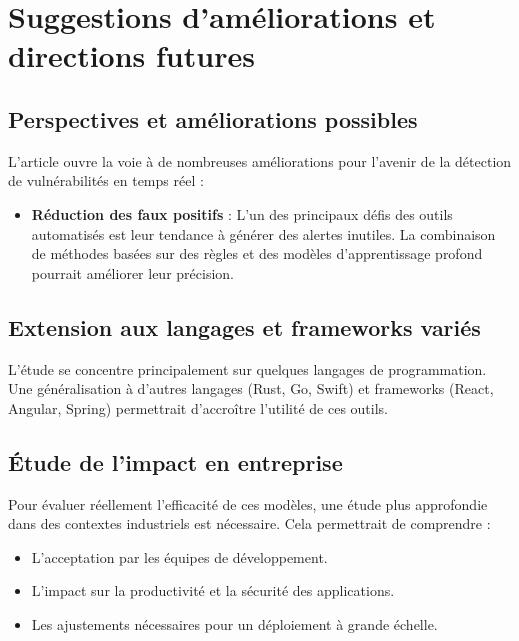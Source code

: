 \chapter{Suggestions d'améliorations et directions futures}



\section{Perspectives et améliorations possibles}



L’article ouvre la voie à de nombreuses améliorations pour l’avenir de la détection de
vulnérabilités en temps réel :



\begin{itemize}

 \item \textbf{Réduction des faux positifs} : L’un des principaux défis des outils
     automatisés est leur tendance à générer des alertes inutiles. La
     combinaison de méthodes basées sur des règles et des modèles
     d’apprentissage profond pourrait améliorer leur précision.

\end{itemize}


\section{Extension aux langages et frameworks variés}



L’étude se concentre principalement sur quelques langages de programmation. Une
généralisation à d’autres langages (Rust, Go, Swift) et frameworks (React,
Angular, Spring) permettrait d’accroître l’utilité de ces outils.

\section{Étude de l’impact en entreprise}

Pour évaluer
réellement l’efficacité de ces modèles, une étude plus approfondie dans des
contextes industriels est nécessaire. Cela permettrait de comprendre :

\begin{itemize}

 \item L’acceptation
     par les équipes de développement.

 \item L’impact
     sur la productivité et la sécurité des applications.

 \item Les
     ajustements nécessaires pour un déploiement à grande échelle.

\end{itemize}



